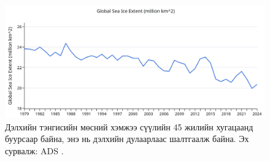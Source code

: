 \documentclass[10pt,twocolumn,letterpaper]{article}
\renewcommand{\refname}{Эшлэлүүд}
\begin{document}
\begin{figure}[t]
\begin{center}
\includegraphics[width=1\textwidth]{ice.jpg}

\end{center}
   \caption{Дэлхийн тэнгисийн мөсний хэмжээ сүүлийн 45 жилийн хугацаанд буурсаар байна, энэ нь дэлхийн дулаарлаас шалтгаалж байна. Эх сурвалж: ADS \cite{149}.}
\label{fig:24}
\end{figure}

\clearpage
\twocolumn

{\small
\renewcommand{\refname}{Ишлэлүүд}


}
\end{document}
